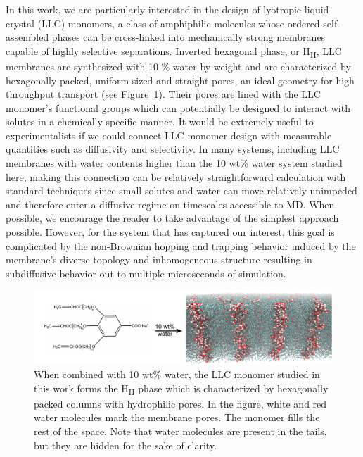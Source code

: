 \documentclass[journal=jpcbfk,manuscript=article]{achemso}
\begin{document}
  In this work, we are particularly interested in the design of lyotropic liquid 
  crystal (LLC) monomers, a class of amphiphilic molecules whose ordered self-assembled
  phases can be cross-linked into mechanically strong membranes capable of highly 
  selective separations. Inverted hexagonal phase, or H\textsubscript{II}, LLC membranes
  are synthesized with 10 \% water by weight and are characterized by hexagonally packed,
  uniform-sized and straight pores, an ideal geometry for high throughput transport (see
  Figure~\ref{fig:membrane_side_profile}). 
  Their pores are lined with the LLC monomer's functional groups which can potentially 
  be designed to interact with solutes in a chemically-specific manner. It would be 
  extremely useful to experimentalists if we could connect LLC monomer design with 
  measurable quantities such as diffusivity and selectivity.
  In many systems, including LLC membranes with water contents higher than the 10 wt\% 
  water system studied here, making this connection can be relatively straightforward 
  calculation with standard techniques since small solutes and water can move relatively
  unimpeded and therefore enter a diffusive regime on timescales accessible to MD. When
  possible, we encourage the reader to take advantage of the simplest approach possible. 
  However, for the system that has captured our interest, this goal is complicated by 
  the non-Brownian hopping and trapping behavior induced by the membrane's diverse
  topology and inhomogeneous structure resulting in subdiffusive behavior out to 
  multiple microseconds of simulation.~\cite{coscia_understanding_2019,coscia_chemically_2019}
  
  \begin{figure}
  \centering
  \includegraphics[width=\textwidth]{membrane_side_profile.pdf}
  \caption{When combined with 10 wt\% water, the LLC monomer studied in this work forms the 
    H\textsubscript{II} phase which is characterized by hexagonally packed columns with 
    hydrophilic pores. In the figure, white and red water molecules mark the membrane pores.
    The monomer fills the rest of the space. Note that water molecules are present in the 
    tails, but they are hidden for the sake of clarity.}\label{fig:membrane_side_profile}
  \end{figure}
  
\end{document}
